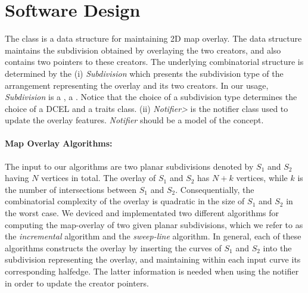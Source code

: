 

\section{Software Design}
The  class 
is a data structure for maintaining 2D map overlay.
The data structure maintains the subdivision obtained by overlaying 
the two creators,
and also contains two pointers to these creators. 
The underlying combinatorial structure is determined by the
(i) {\it Subdivision} which presents the subdivision type of the arrangement 
representing the overlay and its two creators. 
In our usage, {\it Subdivision} is a , 
a .
Notice that the choice of a subdivision type determines the choice 
of a DCEL and a traits class.
(ii) {\it Notifier>} is the notifier class used to update the overlay features. 
{\it Notifier} should be a model of the 
 concept.

\paragraph{Map Overlay Algorithms:}
The input to our algorithms are two planar subdivisions denoted by $S_1$ and $S_2$ having 
$N$ vertices in total. The overlay of $S_1$ and $S_2$ has $N+k$ vertices, 
while $k$ is the number of intersections between 
$S_1$ and $S_2$. 
Consequentially, the combinatorial complexity of the overlay is quadratic 
in the size of $S_1$ and $S_2$ in the worst case.
We deviced and implementated two different algorithms for computing the map-overlay 
of two given planar subdivisions, 
which we refer to as the {\it incremental} algorithm and the {\it sweep-line} algorithm. 
In general, each of these algorithms constructs the overlay by inserting 
the curves of $S_1$ and $S_2$ into the subdivision representing the overlay,
and maintaining within each input curve its corresponding halfedge. 
The latter information is needed when using the notifier in order to
update the creator pointers. 

